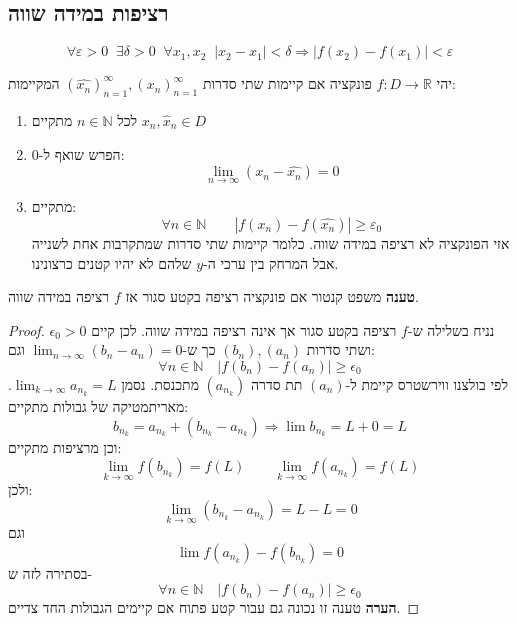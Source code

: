 \documentclass{tstextbook}
\begin{document}
\subsection{רציפות במידה שווה}

\begin{definition}
$$\forall \varepsilon>0 \;\;\exists\delta>0 \;\;\forall x_1, x_2 \;\;|x_2-x_1|<\delta \Rightarrow |f(x_2)-f(x_1)|<\varepsilon$$

\end{definition}
\begin{proposition}
יהי \(f:D\to \mathbb{R}\) פונקציה אם קיימות שתי סדרות \((\hat{x_n})_{n=1}^\infty, (x_n)_{n=1}^\infty\) המקיימות:

  \begin{enumerate}
    \item לכל \(n \in \mathbb{N}\) מתקיים \(x_{n},\hat{x}_{n}\in D\)


    \item הפרש שואף ל-0: 
$$\lim_{n\to\infty} (x_n-\hat{x_n})=0$$


    \item מתקיים: 
 $$\forall n\in\mathbb N \qquad |f(x_n)-f(\hat{x_n})|\geq \varepsilon_0$$
 אזי הפונקציה לא רציפה במידה שווה. כלומר קיימות שתי סדרות שמתקרבות אחת לשנייה אבל המרחק בין ערכי ה-\(y\) שלהם לא יהיו קטנים כרצונינו.


  \end{enumerate}
\end{proposition}
\textbf{טענה} משפט קנטור
 אם פונקציה רציפה בקטע סגור אז \(f\) רציפה במידה שווה.

\begin{proof}
נניח בשלילה ש-\(f\) רציפה בקטע סגור אך אינה רציפה במידה שווה. לכן קיים \(\epsilon_0 > 0\) ושתי סדרות \((b_n), (a_n)\) כך ש-\(\lim_{n\to\infty}(b_n-a_n) = 0\) וגם:
$$\forall n\in\mathbb N\quad |f(b_n)-f(a_n)|\geq \epsilon_0$$
לפי בולצנו ווירשטרס קיימת ל-\((a_n)\) תת סדרה \((a_{n_k})\) מתכנסת. נסמן \(\lim_{k\to\infty} a_{n_k}=L\).
מאריתמטיקה של גבולות מתקיים:
$$b_{n_k} = a_{n_k}+(b_{n_k}- a_{n_k}) \Rightarrow \lim  b_{n_k} = L+0=L$$
וכן מרציפות מתקיים:
$$\lim_{k\rightarrow \infty} f(b_{n_k})=f(L)\qquad \lim_{k\rightarrow \infty} f(a_{n_k})=f(L)$$
ולכן:
$$\lim_{k\rightarrow \infty} (b_{n_k}-a_{n_k})=L-L=0$$
וגם $$\lim f(a_{n_k}) - f(b_{n_k})=0$$
בסתירה לזה ש-$$\forall n\in\mathbb N\quad |f(b_n)-f(a_n)|\geq \epsilon_0$$\textbf{הערה}
טענה זו נכונה גם עבור קטע פתוח אם קיימים הגבולות החד צדיים.

\end{proof}
\end{document}
